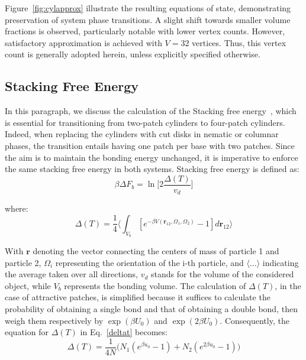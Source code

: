 \documentclass[aip,jcp, amsmath, amssymb, reprint]{revtex4-1}
\begin{document}
Figure~\ref{fig:cylapprox} illustrate the resulting equations of state, demonstrating preservation of system phase
transitions. A slight shift towards smaller volume fractions is observed, particularly notable with lower vertex counts.
However, satisfactory approximation is achieved with $V=32$ vertices. Thus, this vertex count is generally adopted
herein, unless explicitly specified otherwise.

\subsection{Stacking Free Energy}

In this paragraph, we discuss the calculation of the Stacking free energy~\cite{Michele}, which is essential for
transitioning from two-patch cylinders to four-patch cylinders. Indeed, when replacing the cylinders with cut disks in
nematic or columnar phases, the transition entails having one patch per base with two patches. Since the aim is to
maintain the bonding energy unchanged, it is imperative to enforce the same stacking free energy in both systems.
Stacking free energy is defined as:
\begin{equation}
	\beta\Delta F_b=\ln \bigg[2\frac{\Delta(T)}{v_d}\bigg]
	\label{deltaf}
\end{equation}

where:
\begin{equation}
\label{deltat}
	\Delta(T)=\frac{1}{4}\bigg\langle \int_{V_b} [e^{-\beta V(\textbf{r}_{12}, \Omega_1, \Omega_2)}-1]d\textbf{r}_{12}\bigg\rangle
\end{equation}

With $\textbf{r}$ denoting the vector connecting the centers of mass of particle 1 and particle 2, $\Omega_i$
representing the orientation of the i-th particle, and $\langle\ldots\rangle$ indicating the average taken over all
directions, $v_d$ stands for the volume of the considered object, while $V_b$ represents the bonding volume. The
calculation of $\Delta (T)$, in the case of attractive patches, is simplified because it suffices to calculate the
probability of obtaining a single bond and that of obtaining a double bond, then weigh them respectively by $\exp(\beta
U_0)$ and $\exp(2\beta U_0)$. Consequently, the equation for $\Delta (T)$ in Eq.~\eqref{deltat} becomes:
\begin{equation}
\label{deltat2}
	\Delta(T)=\frac{1}{4N}\big( N_1(e^{\beta u_0}-1)+N_2(e^{2\beta u_0}-1)\big)
\end{equation}
\end{document}
